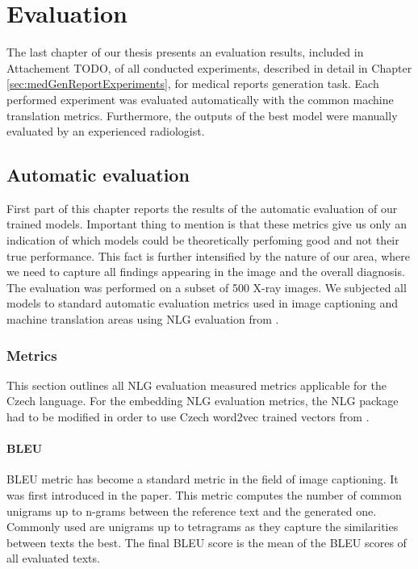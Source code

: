\chapter{Evaluation}
The last chapter of our thesis presents an evaluation results, included in Attachement TODO, of all conducted experiments, described in detail in Chapter \ref{sec:medGenReportExperiments}, for medical reports generation task. Each performed experiment was evaluated automatically with the common machine translation metrics. Furthermore, the outputs of the best model were manually evaluated by an experienced radiologist.

\section{Automatic evaluation}
First part of this chapter reports the results of the automatic evaluation of our trained models. Important thing to mention is that these metrics give us only an indication of which models could be theoretically perfoming good and not their true performance. This fact is further intensified by the nature of our area, where we need to capture all findings appearing in the image and the overall diagnosis. \\

The evaluation was performed on a subset of 500 X-ray images. We subjected all models to standard automatic evaluation metrics used in image captioning and machine translation areas using NLG evaluation from \citet{sharma2017nlgeval}.

\subsection{Metrics}
This section outlines all NLG evaluation measured metrics applicable for the Czech language. For the embedding NLG evaluation metrics, the NLG package had to be modified in order to use Czech word2vec trained vectors from \citet{grave2018learning}.

\subsubsection*{BLEU}
BLEU metric has become a standard metric in the field of image captioning. It was first introduced in the \citet{papineni2002bleu} paper. This metric computes the number of common unigrams up to n-grams between the reference text and the generated one. Commonly used are unigrams up to tetragrams as they capture the similarities between texts the best. The final BLEU score is the mean of the BLEU scores of all evaluated texts.


